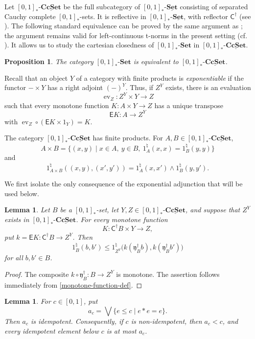 \documentclass{birkau}
\theoremstyle{plain}
\newtheorem{lem}[thm]{Lemma}
\newtheorem{prop}[thm]{Proposition}
\theoremstyle{definition}
\DeclareMathOperator{\ev}{ev}
\newcommand{\nat}{\natural}
\newcommand{\sC}{\mathsf{C}}
\newcommand{\sE}{\mathsf{E}}
\newcommand{\Fy}{\mathfrak{y}}
\newcommand{\Set}{\mathbf{Set}}
\newcommand{\CcSet}{\mathbf{CcSet}}
\newcommand{\RSet}{[0,1]_*\text{-}\Set}
\newcommand{\RSetM}{[0,1]_*\text{-}\underline{\Set}}
\newcommand{\RCcSetM}{[0,1]_*\text{-}\underline{\CcSet}}
\newcommand{\sCd}{\sC^{\dag}}
\newcommand{\Fyd}{\Fy^{\dag}}
\renewcommand{\leq}{\leqslant}
\numberwithin{equation}{section}
\begin{document}
Let $\RCcSetM$ be the full subcategory of $\RSetM$ consisting of separated Cauchy complete $[0,1]_*$-sets. It is reflective in $\RSetM$, with reflector $\sCd$ (see \cite[Proposition 7.14]{Stubbe2005}). The following standard equivalence can be proved by the same argument as \cite[Proposition 5.7(2)]{Pu2012}; the argument remains valid for left-continuous t-norms in the present setting (cf. \cite{Stubbe2005,Hoehle2011a}). It allows us to study the cartesian closedness of $\RSet$ in $\RCcSetM$.

\begin{prop} \label{RSet-RCcSetM}
The category $\RSet$ is equivalent to $\RCcSetM$.
\end{prop}


Recall that an object $Y$ of a category with finite products is \emph{exponentiable} if the functor $-\times Y$ has a right adjoint $(-)^Y$. Thus, if $Z^Y$ exists, there is an evaluation
\[\ev_Z\colon Z^Y\times Y\to Z\]
such that every monotone function $K\colon A\times Y\to Z$ has a unique transpose
\[\sE K\colon A\to Z^Y\]
with $\ev_Z\circ(\sE K\times1_Y)=K$.

The category $\RCcSetM$ has finite products. For $A,B\in\RCcSetM$,
\begin{equation} \label{X-times-Y-def}
A\times B=\{(x,y)\mid x\in A,\ y\in B,\ 1_A^{\nat}(x,x)=1_B^{\nat}(y,y)\}
\end{equation}
and
\[
1_{A\times B}^{\nat}\left((x,y),(x',y')\right)=1_A^{\nat}(x,x')\wedge1_B^{\nat}(y,y').
\]

We first isolate the only consequence of the exponential adjunction that will be used below.

\begin{lem} \label{Z^Y-hom}
Let $B$ be a $[0,1]_*$-set, let $Y,Z\in\RCcSetM$, and suppose that $Z^Y$ exists in $\RCcSetM$. For every monotone function
\[
K\colon\sCd B\times Y\to Z,
\]
put $k=\sE K\colon\sCd B\to Z^Y$. Then
\[
1_B^{\nat}(b,b')\leq1_{Z^Y}^{\nat}\bigl(k(\Fyd_Bb),k(\Fyd_Bb')\bigr)
\]
for all $b,b'\in B$.
\end{lem}

\begin{proof}
The composite $k\circ\Fyd_B\colon B\to Z^Y$ is monotone. The assertion follows immediately from \eqref{monotone-function-def}.
\end{proof}

\begin{lem} \label{sup-idem}
For $c\in[0,1]$, put
\[
a_c=\bigvee\{e\leq c\mid e*e=e\}.
\]
Then $a_c$ is idempotent. Consequently, if $c$ is non-idempotent, then $a_c<c$, and every idempotent element below $c$ is at most $a_c$.
\end{lem}
\end{document}

